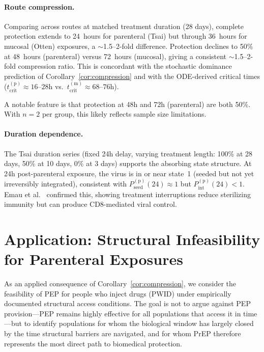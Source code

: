 \documentclass[12pt,a4paper]{article}
\theoremstyle{plain}
\theoremstyle{definition}
\theoremstyle{remark}
\newcommand{\Pint}{P_{\mathrm{int}}}
\newcommand{\Pseed}{P_{\mathrm{seed}}}
\newcommand{\tcrit}{t_{\mathrm{crit}}}
\begin{document}
\paragraph{Route compression.} Comparing across routes at matched treatment duration (28 days), complete protection extends to 24~hours for parenteral (Tsai) but through 36~hours for mucosal (Otten) exposures, a $\sim$1.5--2-fold difference. Protection declines to 50\% at 48~hours (parenteral) versus 72~hours (mucosal), giving a consistent $\sim$1.5--2-fold compression ratio. This is concordant with the stochastic dominance prediction of Corollary~\ref{cor:compression} and with the ODE-derived critical times ($\tcrit^{(\mathrm{p})} \approx 16$--$28$h vs.\ $\tcrit^{(\mathrm{m})} \approx 68$--$76$h).

A notable feature is that protection at 48h and 72h (parenteral) are both 50\%. With $n = 2$ per group, this likely reflects sample size limitations.

\paragraph{Duration dependence.} The Tsai duration series (fixed 24h delay, varying treatment length: 100\% at 28 days, 50\% at 10 days, 0\% at 3 days) supports the absorbing state structure. At 24h post-parenteral exposure, the virus is in or near state~1 (seeded but not yet irreversibly integrated), consistent with $\Pseed^{(\mathrm{p})}(24) \approx 1$ but $\Pint^{(\mathrm{p})}(24) < 1$. Emau et al.\ \citep{ref:Emau2006} confirmed this, showing treatment interruptions reduce sterilizing immunity but can produce CD8-mediated viral control.


\section{Application: Structural Infeasibility for Parenteral Exposures}\label{sec:application}

As an applied consequence of Corollary~\ref{cor:compression}, we consider the feasibility of PEP for people who inject drugs (PWID) under empirically documented structural access conditions. The goal is not to argue against PEP provision---PEP remains highly effective for all populations that access it in time---but to identify populations for whom the biological window has largely closed by the time structural barriers are navigated, and for whom PrEP therefore represents the most direct path to biomedical protection.
\end{document}
